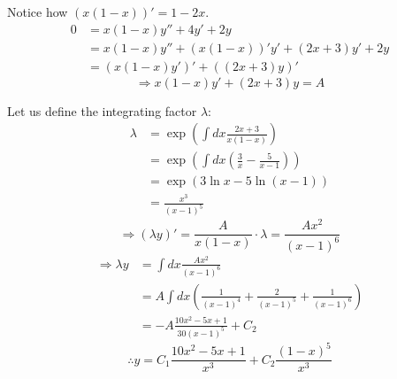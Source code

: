 \item

Notice how $(x(1 - x))' = 1 - 2x$.
\begin{align*}
	0
	&= x(1 - x) y'' + 4y' + 2y \\
	&= x(1 - x) y'' + (x(1 - x))' y' + (2x + 3) y' + 2y \\
	&= (x(1 - x)y')' + ((2x + 3)y)'
\end{align*}
\[
	\Rightarrow x(1 - x)y' + (2x + 3)y = A
\]

Let us define the integrating factor $\lambda$:
\begin{align*}
	\lambda
	&= \exp \left( \int dx \frac{2x + 3}{x(1 - x)} \right) \\
	&= \exp \left( \int dx \left( \frac{3}{x} - \frac{5}{x - 1} \right) \right) \\
	&= \exp \left( 3 \ln x - 5 \ln (x - 1) \right) \\
	&= \frac{x^3}{{(x - 1)}^5}
\end{align*}
\[
	\Rightarrow (\lambda y)' = \frac{A}{x(1 - x)} \cdot \lambda = \frac{Ax^2}{{(x - 1)}^6}
\]
\begin{align*}
	\Rightarrow \lambda y
	&= \int dx \frac{Ax^2}{{(x - 1)}^6} \\
	&= A \int dx \left( \frac{1}{{(x - 1)}^4} + \frac{2}{{(x - 1)}^5} + \frac{1}{{(x - 1)}^6} \right) \\
	&= -A \frac{10x^2 - 5x + 1}{30 {(x - 1)}^5} + C_2
\end{align*}
\[
	\therefore y = C_1 \frac{10x^2 - 5x + 1}{x^3} + C_2 \frac{{(1 - x)}^5}{x^3}
\]